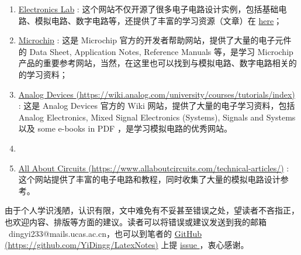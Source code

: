 \documentclass[UTF8]{report}
\begin{document}
\begin{cnabstract}
\begin{enumerate}
\item \href{https://www.electronics-lab.com}{Electronics Lab} : 这个网站不仅开源了很多电子电路设计实例，包括基础电路、模拟电路、数字电路等，还提供了丰富的学习资源（文章）在 \href{https://www.electronics-lab.com/articles/}{here}；

\item \href{https://developerhelp.microchip.com/}{Microchip} : 这是 Microchip 官方的开发者帮助网站，提供了大量的电子元件的 Data Sheet, Application Notes, Reference Manuals 等，是学习 Microchip 产品的重要参考网站，当然，在这里也可以找到与模拟电路、数字电路相关的的学习资料；

\item \href{https://wiki.analog.com/university/courses/tutorials/index}{Analog Devices {\color{black}(https://wiki.analog.com/university/courses/tutorials/index)}} : 这是 Analog Devices 官方的 Wiki 网站，提供了大量的电子学习资料，包括 Analog Electronics, Mixed Signal Electronics (Systems), Signals and Systems 以及 some e-books in PDF ，是学习模拟电路的优秀网站。

\item \item \href{https://www.allaboutcircuits.com/technical-articles/}{  All About Circuits  {\color{black} (https://www.allaboutcircuits.com/technical-articles/)}} : 这个网站提供了丰富的电子电路和教程，同时收集了大量的模拟电路设计参考。
\end{enumerate}

由于个人学识浅陋，认识有限，文中难免有不妥甚至错误之处，望读者不吝指正，也欢迎内容、排版等方面的建议。读者可以将错误或建议发送到我的邮箱 {\color{blue}\ dingyi233@mails.ucas.ac.cn}，也可以到笔者的 \href{https://github.com/YiDingg/LatexNotes}{GitHub (https://github.com/YiDingg/LatexNotes)} 上提 %
\href{https://github.com/YiDingg/LatexNotes/issues
}{ %
issue
}，衷心感谢。

\end{cnabstract}



    \setcounter{tocdepth}{2}    %
        \tableofcontents
        \thispagestyle{fancy}                   %
\end{document}
